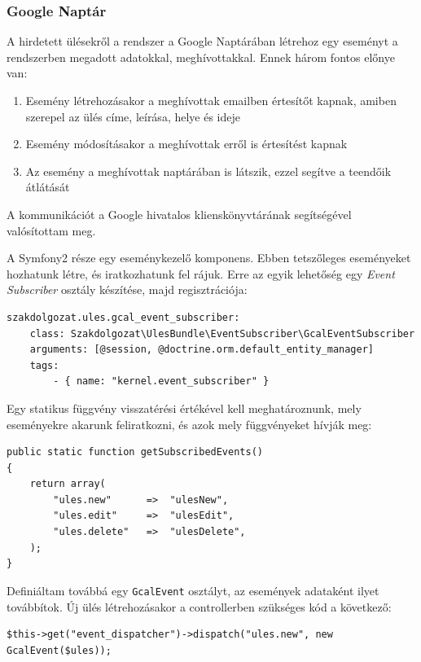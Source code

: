 \documentclass[a4paper,12pt,oneside]{report}
\begin{document}
\subsubsection*{Google Naptár}

A hirdetett ülésekről a rendszer a Google Naptárában létrehoz egy eseményt a rendszerben megadott adatokkal, meghívottakkal. Ennek három fontos előnye van:

\begin{enumerate}
    \item Esemény létrehozásakor a meghívottak emailben értesítőt kapnak, amiben szerepel az ülés címe, leírása, helye és ideje
    \item Esemény módosításakor a meghívottak erről is értesítést kapnak
    \item Az esemény a meghívottak naptárában is látszik, ezzel segítve a teendőik átlátását
\end{enumerate}

A kommunikációt a Google hivatalos klienskönyvtárának segítségével valósítottam meg.

A Symfony2 része egy eseménykezelő komponens. Ebben tetszőleges eseményeket hozhatunk létre, és iratkozhatunk fel rájuk. Erre az egyik lehetőség egy {\it Event Subscriber} osztály készítése, majd regisztrációja:

\begin{lstlisting}
szakdolgozat.ules.gcal_event_subscriber:
    class: Szakdolgozat\UlesBundle\EventSubscriber\GcalEventSubscriber
    arguments: [@session, @doctrine.orm.default_entity_manager]
    tags:
        - { name: "kernel.event_subscriber" }
\end{lstlisting}

Egy statikus függvény visszatérési értékével kell meghatároznunk, mely eseményekre akarunk feliratkozni, és azok mely függvényeket hívják meg:

\begin{lstlisting}
public static function getSubscribedEvents()
{
    return array(
        "ules.new"      =>  "ulesNew",
        "ules.edit"     =>  "ulesEdit",
        "ules.delete"   =>  "ulesDelete",
    );
}
\end{lstlisting}

Definiáltam továbbá egy {\tt GcalEvent} osztályt, az események adataként ilyet továbbítok. Új ülés létrehozásakor a controllerben szükséges kód a következő:

\begin{lstlisting}
$this->get("event_dispatcher")->dispatch("ules.new", new GcalEvent($ules));
\end{lstlisting}
\end{document}
